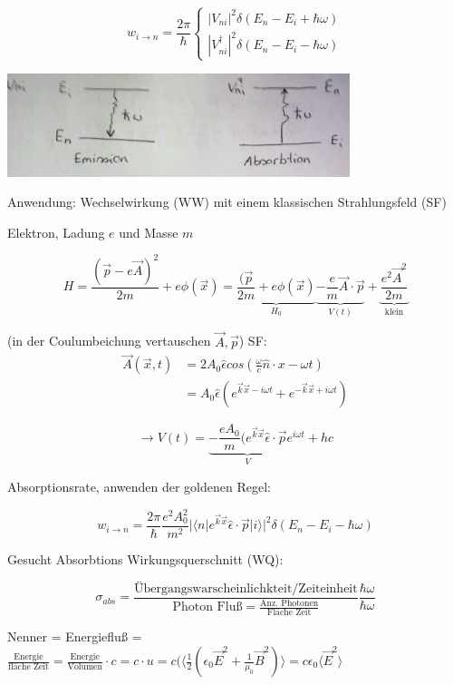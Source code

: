 \[\boxed{ w_{i\rightarrow n} = \frac{2\pi}{\hbar} \begin{cases}
    |V_{ni}|^2 \delta(E_n-E_i+\hbar\omega) \\
    |V^\dagger_{ni}|^2 \delta(E_n-E_i-\hbar\omega)
  \end{cases}}\]




\includegraphics[width=0.75\textwidth]{kap03_09.png}

Anwendung: Wechselwirkung (WW) mit einem klassischen Strahlungsfeld (SF)

Elektron, Ladung \(e\) und Masse \(m\)

\[ H = \frac{(\vec p - e\vec A)^2}{2m}+e\phi(\vec x) =  \underbrace{\frac{(\vec p}{2m}+e\phi(\vec x)}_{H_0}\underbrace{ - \frac{e}{m}\vec A\cdot \vec p}_{V(t)}+\underbrace{\frac{e^2\vec A^2}{2m}}_{\text{klein}}\]

(in der Coulumbeichung vertauschen \(\vec A,\vec p\)) SF:
\begin{align}
  \vec A(\vec x,t) &= 2A_0 \hat \epsilon cos(\frac{\omega}{c}\hat n\cdot x -\omega t)\\
  &= A_0 \hat \epsilon (e^{\vec k\vec x-i\omega t}+e^{-\vec k\vec x+i\omega t})
\end{align}

\[\rightarrow V(t) = \underbrace{-\frac{eA_0}{m}(e^{\vec k\vec x}\hat \epsilon\cdot\vec p}_{V} e^{i\omega t} + hc\]

Absorptionsrate, anwenden der goldenen Regel:

\[ w_{i\rightarrow n} = \frac{2\pi}{\hbar} \frac{e^2 A_0^2}{m^2} |\langle n|e^{\vec k\vec x}\hat \epsilon\cdot\vec p|i\rangle |^2 \delta(E_n-E_i-\hbar\omega)\]

Gesucht Absorbtions Wirkungsquerschnitt (WQ):

\[ \sigma_{abs} = \frac{\text{Übergangswarscheinlichkteit/Zeiteinheit}}{\text{Photon Fluß} = \frac{\text{Anz. Photonen}}{\text{Fläche Zeit}}}\frac{\hbar\omega}{\hbar\omega}\]

Nenner = Energiefluß = \(\frac{\text{Energie}}{\text{fläche Zeit}} = \frac{\text{Energie}}{\text{Volumen}}\cdot c = c\cdot u= c(\langle \frac{1}{2}(\epsilon_0\vec E^2 +\frac{1}{\mu_0}\vec B^2)\rangle = c\epsilon_0\langle \vec E^2\rangle \)

